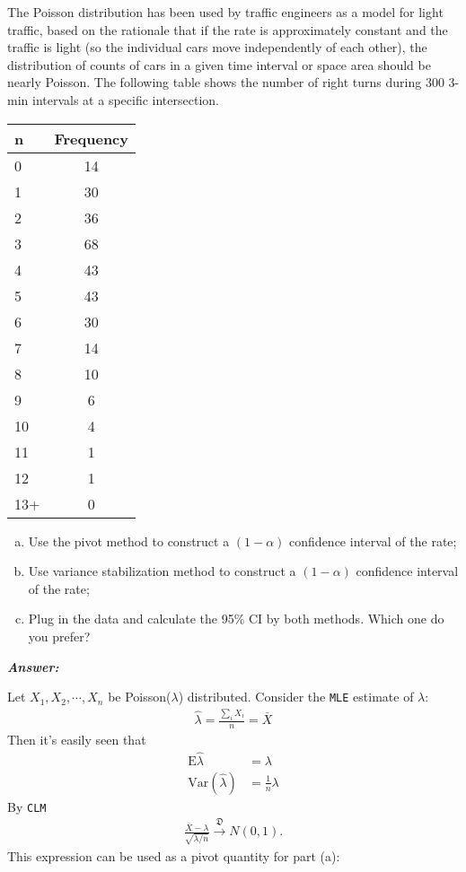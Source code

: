 \documentclass[12pt]{article}
\newenvironment{question}[2][Question]{\begin{trivlist}
\item[\hskip \labelsep {\bfseries #1}\hskip \labelsep {\bfseries #2.}]}{\end{trivlist}}
\begin{document}
\bigskip
\bigskip
 \begin{question}{8.4} The Poisson distribution has been used by traffic engineers as a model for light traffic, based
on the rationale that if the rate is approximately constant and the traffic is light (so the individual
cars move independently of each other), the distribution of counts of cars in a given time interval
or space area should be nearly Poisson. The following table shows the number of right turns during
300 3-min intervals at a specific intersection.\\


\begin{tabular}{ l c }
\hline
n & Frequency\\
\hline
0 & 14\\
1 & 30\\
2 & 36\\
3 & 68\\
4 & 43\\
5 & 43\\
6 & 30\\
7 & 14\\
8 & 10\\
9 & 6\\
10 & 4\\
11 & 1\\
12 & 1\\
13+ & 0\\
\end{tabular}

\begin{enumerate}[(a)]
\item Use the pivot method to construct a $(1 - \alpha)$ confidence interval of the rate;
\item Use variance stabilization method to construct a $(1 - \alpha)$ confidence interval of the rate;
\item Plug in the data and calculate the 95\% CI by both methods. Which one do you prefer?
\end{enumerate}
\end{question}


    \textbf{\color{TealBlue}\emph{Answer:} } 
    
    
\bigskip
Let $X_1, X_2, \cdots, X_n$ be Poisson($\lambda$) distributed.  Consider the \texttt{MLE} estimate of $\lambda$:
\begin{align*}
\hat \lambda = \frac{\sum_i X_i}{n} = \bar X
\end{align*}
Then it's easily seen that 
\begin{align*}
\mathrm{E} \hat \lambda &= \lambda \\
\mathrm{Var}(\hat \lambda) &= \frac{1}{n} \lambda
\end{align*}
By \texttt{CLM}
 \begin{align*}
\frac{\bar X - \lambda} {\sqrt{\lambda /  n}}  \xrightarrow{\mathfrak{D}}  N(0, 1).
\end{align*}
This expression can be used as a pivot quantity for part (a):
\end{document}
